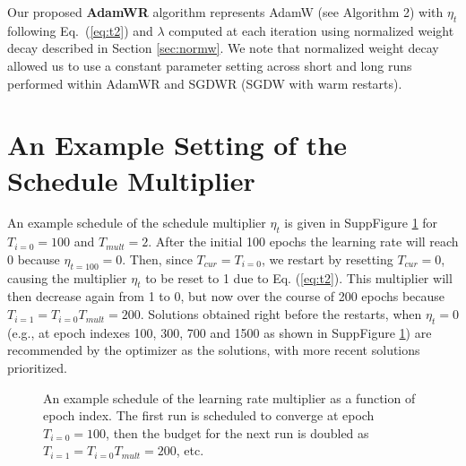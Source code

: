 \documentclass[usenames,dvipsnames]{article} %
\begin{document}
Our proposed \textbf{AdamWR} algorithm represents AdamW (see Algorithm 2) with $\eta_t$ following Eq.\ (\ref{eq:t2}) and $\lambda$ computed at each iteration using normalized weight decay described in Section \ref{sec:normw}. %
We note that normalized weight decay allowed us to use a constant parameter setting across short and long runs performed within AdamWR and SGDWR (SGDW with warm restarts).


\section{An Example Setting of the Schedule Multiplier}
\label{sec:example}

An example schedule of the schedule multiplier $\eta_t$ is given in SuppFigure \ref{fig1_lr} for $T_{i=0}=100$ and $T_{mult}=2$. After the initial 100 epochs the learning rate will reach 0 because $\eta_{t=100}=0$. Then, since $T_{cur} = T_{i=0}$, 
we restart by resetting $T_{cur}=0$, causing the multiplier $\eta_t$ to be reset to 1 due to Eq. (\ref{eq:t2}). This multiplier will then decrease again from 1 to 0, but now over the course of 200 epochs because $T_{i=1}=T_{i=0} T_{mult}=200$. Solutions obtained right before the restarts, when $\eta_t=0$ (e.g., at epoch indexes 100, 300, 700 and 1500 as shown in SuppFigure \ref{fig1_lr}) are recommended by the optimizer as the solutions, with more recent solutions prioritized. 


\setcounter{figure}{0}
\makeatletter
\renewcommand{\fnum@figure}{SuppFigure ~\thefigure}
\makeatother

\begin{figure}[t!]%
\caption{\label{fig1_lr} An example schedule of the learning rate multiplier as a function of epoch index. The first run is scheduled to converge at epoch $T_{i=0}=100$, then the budget for the next run is doubled as $T_{i=1}=T_{i=0} T_{mult}=200$, etc.} 
\end{figure}
\end{document}
